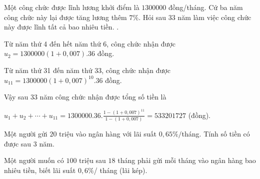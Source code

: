 \begin{bt}%
	Một công chức được lĩnh lương khởi điểm là $1300000$ đồng/tháng. Cứ ba năm công chức này lại được tăng lương thêm $7\%$. Hỏi sau $33$ năm làm việc công chức này được lĩnh tất cả bao nhiêu tiền.
	.
	
	Từ năm thứ 4 đến hết năm thứ 6, công chức nhận được $u_2=1300000 (1+0,007).36$ đồng.
	
	Từ năm thứ 31 đến năm thứ 33, công chức nhận được $u_{11}=1300000(1+0,007)^{10}.36$ đồng.
	
	Vậy sau 33 năm công chức nhận được tổng số tiền là
	
	$u_1+u_2+ \cdots + u_{11}= 1300000 . 36. \displaystyle \frac{1-(1+0,007)^{11}}{1-(1+0,007)}=533201727$ (đồng).
\end{bt}

\begin{bt}%
	Một người gửi $20$ triệu vào ngân hàng với lãi suất $0,65\%/$tháng. Tính số tiền có được sau $3$ năm.
\end{bt}
\begin{bt}%
	Một người muốn có $100$ triệu sau $18$ tháng phải gửi mỗi tháng vào ngân hàng bao nhiêu tiền, biết lãi suất $0,6\%$/ tháng (lãi kép).
\end{bt}

